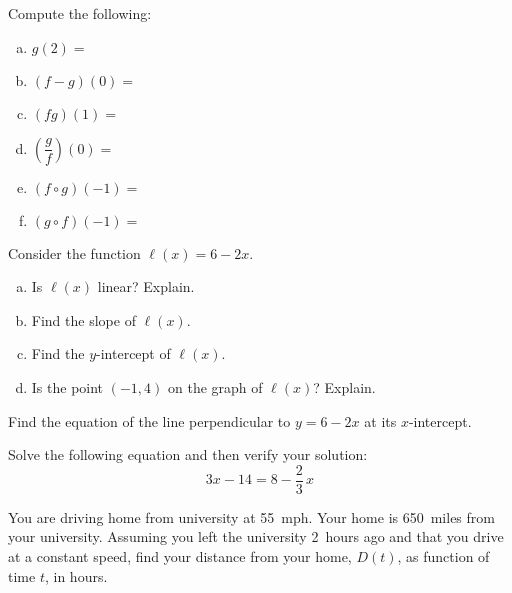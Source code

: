 \documentclass[12pt,letterpaper]{exam}
\begin{document}
\begin{questions}
Compute the following: \pspace
        \begin{enumerate}[(a)]
        \item $g(2)=$ \vfill
        \item $(f - g)(0)=$ \vfill
        \item $(fg)(1)=$ \vfill
        \item $\left( \dfrac{g}{f} \right)(0)=$ \vfill
        \item $(f \circ g)(-1)=$ \vfill
        \item $(g \circ f)(-1)=$ \vfill
        \end{enumerate}



\newpage



\question[8] Consider the function $\ell(x)= 6 - 2x$. \pspace
	\begin{enumerate}[(a)]
	\item Is $\ell(x)$ linear? Explain. \vfill
	\item Find the slope of $\ell(x)$. \vfill
	\item Find the $y$-intercept of $\ell(x)$. \vfill
	\item Is the point $(-1, 4)$ on the graph of $\ell(x)$? Explain. \pvspace{3cm}\vfill
	\end{enumerate}



\newpage



\question[6] Find the equation of the line perpendicular to $y= 6 - 2x$ at its $x$-intercept. 



\newpage



\question[6] Solve the following equation and then verify your solution:
	\[
	3x -14= 8 - \frac{2}{3}\,x
	\]


\newpage



\question[8] You are driving home from university at 55~mph. Your home is 650~miles from your university. Assuming you left the university 2~hours ago and that you drive at a constant speed, find your distance from your home, $D(t)$, as function of time $t$, in hours. 



\newpage




\end{questions}
\end{document}
